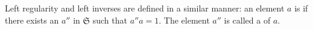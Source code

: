 Left regularity and left inverses are defined in a similar manner: an element $a$ is  if there exists an $a''$ in $\mathfrak{S}$ such that $a''a = 1$. The element $a''$ is called a  of $a$.
